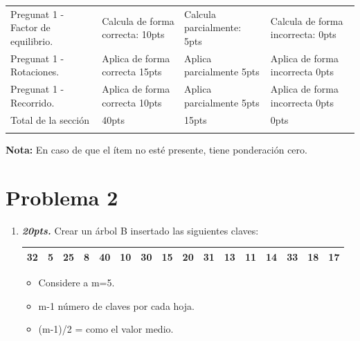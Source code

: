 \documentclass{exam}
\begin{document}
\begin{enumerate}
\begin{table}[H]
\begin{tabular}{
    !{\color{gray!50}\vrule}p{3.9cm}
    !{\color{gray!50}\vrule}p{3.6cm}
    !{\color{gray!50}\vrule}p{3.6cm}
    !{\color{gray!50}\vrule}p{3.6cm}
    !{\color{gray!50}\vrule}}
    Pregunat 1 - Factor de equilibrio. &
    Calcula de forma correcta: 10pts   &
    Calcula parcialmente: 5pts  &
    Calcula de forma incorrecta: 0pts \\  \hline

    Pregunat 1 - Rotaciones. &
    Aplica de forma correcta 15pts   &
    Aplica parcialmente 5pts &
    Aplica de forma incorrecta  0pts\\  \hline

    Pregunat 1 - Recorrido. &
    Aplica de forma correcta 10pts   &
    Aplica parcialmente 5pts &
    Aplica de forma incorrecta  0pts\\  \hline

    Total de la sección &  40pts & 15pts & 0pts\\  \hline
  \end{tabular}
  \label{tbl:1}
\end{table}

\vspace{-5mm} \textbf{Nota:} En caso de que el ítem no esté presente,
tiene ponderación cero.

\newpage
\vspace{-7mm}
\section{\textbf{Problema 2}}
\noindent

\begin{questions}

  \begin{enumerate}
  \item \textbf{\emph{20pts.}} Crear un árbol B insertado las siguientes claves:

  \begin{table}[H]
  \centering
  \begin{tabular}{|l|l|l|l|l|l|l|l|l|l|l|l|l|l|l|l|}
  \hline
    32&	5	&25&	8&	40&	10&	30&	15&	20&	31&	13&	11&	14&	33&	18&	17\\
  \hline
  \end{tabular}
  \end{table}

\begin{itemize}
  \item Considere a m=5.
  \item m-1 número de claves por cada hoja.
  \item (m-1)/2 = como el valor medio.
\end{itemize}


\end{enumerate}
\end{questions}
\end{enumerate}
\end{document}
